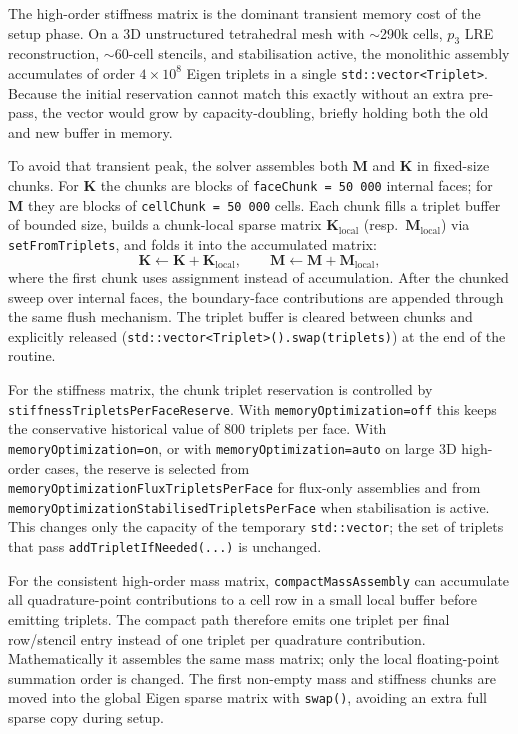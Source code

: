 \documentclass[11pt,a4paper]{article}
\newcommand{\code}[1]{\texttt{\small #1}}
\newcommand{\Mmass}{\mathbf{M}}
\newcommand{\Kstif}{\mathbf{K}}
\begin{document}
The high-order stiffness matrix is the dominant transient memory cost of the
setup phase. On a 3D unstructured tetrahedral mesh with $\sim$290k cells, $p_3$
LRE reconstruction, $\sim$60-cell stencils, and stabilisation active, the
monolithic assembly accumulates of order $4\times 10^8$ Eigen triplets in a
single \code{std::vector<Triplet>}. Because the initial reservation cannot
match this exactly without an extra pre-pass, the vector would grow by
capacity-doubling, briefly holding both the old and new buffer in memory.

To avoid that transient peak, the solver assembles both $\Mmass$ and $\Kstif$
in fixed-size chunks. For $\Kstif$ the chunks are blocks of
\code{faceChunk = 50\,000} internal faces; for $\Mmass$ they are blocks of
\code{cellChunk = 50\,000} cells. Each chunk fills a triplet buffer of bounded
size, builds a chunk-local sparse matrix $\Kstif_{\mathrm{local}}$
(resp.\ $\Mmass_{\mathrm{local}}$) via \code{setFromTriplets}, and folds it
into the accumulated matrix:
\begin{equation}
  \Kstif \leftarrow \Kstif + \Kstif_{\mathrm{local}},
  \qquad
  \Mmass \leftarrow \Mmass + \Mmass_{\mathrm{local}},
  \label{eq:chunk-fold}
\end{equation}
where the first chunk uses assignment instead of accumulation. After the
chunked sweep over internal faces, the boundary-face contributions are
appended through the same flush mechanism. The triplet buffer is cleared
between chunks and explicitly released
(\code{std::vector<Triplet>().swap(triplets)}) at the end of the routine.

For the stiffness matrix, the chunk triplet reservation is controlled by
\code{stiffnessTripletsPerFaceReserve}. With \code{memoryOptimization=off} this
keeps the conservative historical value of 800 triplets per face. With
\code{memoryOptimization=on}, or with \code{memoryOptimization=auto} on large
3D high-order cases, the reserve is selected from
\code{memoryOptimizationFluxTripletsPerFace} for flux-only assemblies and from
\code{memoryOptimizationStabilisedTripletsPerFace} when stabilisation is
active. This changes only the capacity of the temporary \code{std::vector}; the
set of triplets that pass \code{addTripletIfNeeded(...)} is unchanged.

For the consistent high-order mass matrix, \code{compactMassAssembly} can
accumulate all quadrature-point contributions to a cell row in a small local
buffer before emitting triplets. The compact path therefore emits one triplet
per final row/stencil entry instead of one triplet per quadrature contribution.
Mathematically it assembles the same mass matrix; only the local floating-point
summation order is changed. The first non-empty mass and stiffness chunks are
moved into the global Eigen sparse matrix with \code{swap()}, avoiding an
extra full sparse copy during setup.
\end{document}
